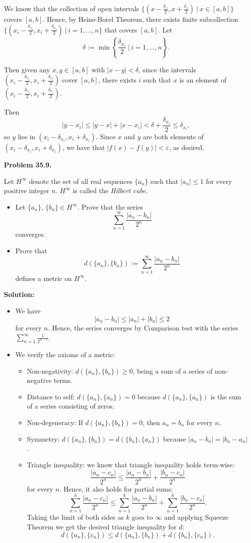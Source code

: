 \documentclass[12pt]{article}
\def\black{\color{black}}
\def\green{\color{rltgreen}}
\newcommand\bi{\begin{itemize}}
\newcommand\ei{\end{itemize}}
\newcommand\itema{\item[(a)]}
\newcommand\itemb{\item[(b)]}
\renewcommand\|{\ | \ }
\def\pb#1{{\green \bf Problem #1.}\hskip 8pt \black}
\def\sol{\textbf{Solution:}}
\def\sequence#1{$\{{#1}_n\}$}
\def\sumint#1{\sum_{#1=1}^\infty}
\newcommand\e\varepsilon
\begin{document}
We know that the collection of open intervals 
$\{(x - \frac {\delta_x} 2, x + \frac {\delta_x} 2) \| x \in [a, b]\}$
covers $[a, b]$. Hence, by Heine-Borel Theorem, there exists finite
subcollection
$\{(x_i - \frac {\delta_{x_i}} 2, x_i + \frac {\delta_{x_i}} 2)
\| i = 1, \ldots, n\}$ that covers $[a, b]$. Let
\[
\delta := \min\left\{ \frac {\delta_{x_i}} 2 \| i = 1, \ldots, n\right\}.
\]

Then given any $x, y \in [a, b]$ with $|x - y| < \delta$, since the
intervals $(x_i - \frac {\delta_{x_i}} 2, x_i + \frac {\delta_{x_i}} 2)$
cover $[a, b]$, there exists $i$ such that 
$x$ is an element of
$(x_i - \frac {\delta_{x_i}} 2, x_i + \frac {\delta_{x_i}} 2)$.

Then
\[
|y - x_i| \leq |y - x| + |x - x_i| < \delta + \frac {\delta_{x_i}} 2 
\leq \delta_{x_i},
\]
so $y$ lies in
$(x_i - \delta_{x_i}, x_i + \delta_{x_i})$. Since $x$ and $y$ are 
both elements of $(x_i - \delta_{x_i}, x_i + \delta_{x_i})$, we have that
$|f(x) - f(y)| < \e$, as desired.

\pb{35.9}

Let $H^\infty$ denote the set of all real sequences \sequence a such that
$|a_n| \leq 1$ for every positive integer $n$. $H^\infty$ is called the
\emph{Hilbert cube}.

\bi
\itema
Let \sequence a, \sequence b$\in H^\infty$. Prove that the series
\[
\sumint n \frac {|a_n - b_n|} {2^n}
\]
converges.
\itemb
Prove that 
\[
d(\{a_n\}, \{b_n\}) := \sumint n \frac {|a_n - b_n|} {2^n}
\]
defines a metric on $H^\infty$.
\ei

\sol

\bi
\itema
We have
\[
|a_n - b_n| \leq |a_n| + |b_n| \leq 2
\]
for every $n$. Hence, the series converges by Comparison test with the
series $\sumint n \frac 1{2^{n - 1}}$.
\itemb
We verify the axioms of a metric:
\bi
\item
Non-negativity:
$d(\{a_n\}, \{b_n\}) \geq 0$, being a sum of a series of non-negative terms.
\item
Distance to self:
$d(\{a_n\}, \{a_n\}) = 0$ because $d(\{a_n\}, \{a_n\})$ is the sum of a 
series consisting of zeros. 
\item
Non-degeneracy: If $d(\{a_n\}, \{b_n\}) = 0$,
then $a_n = b_n$ for every $n$.
\item
Symmetry:
$d(\{a_n\}, \{b_n\}) = d(\{b_n\}, \{a_n\})$ because 
$|a_n - b_n| = |b_n - a_n|$.
\item
Triangle inequality: we know that triangle inequality holds term-wise:
\[
\frac{|a_n - c_n|} {2^n} \leq \frac{|a_n - b_n|}{2^n}
	+ \frac{|b_n - c_n|} {2^n}
\]
for every $n$. Hence, it also holds for partial sums:
\[
\sum_{n=1}^k\frac{|a_n - c_n|} {2^n}
	\leq \sum_{n=1}^k \frac{|a_n - b_n|}{2^n}
    + \sum_{n=1}^k \frac{|b_n - c_n|} {2^n}.
\]
Taking the limit of both sides as $k$ goes to $\infty$ and applying 
Squeeze Theorem we get the desired triangle inequality for $d$:
\[
d(\{a_n\}, \{c_n\}) \leq d(\{a_n\}, \{b_n\}) + d(\{b_n\}, \{c_n\}).
\]
\ei
\ei
\end{document}
